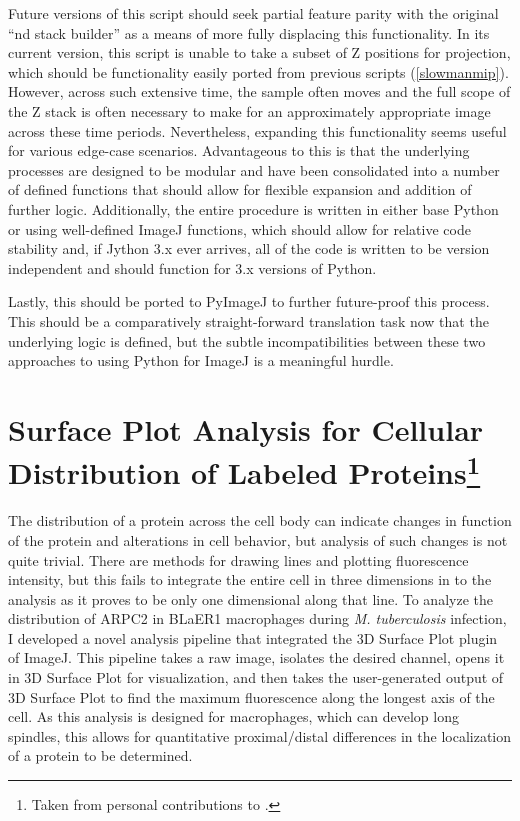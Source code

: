 Future versions of this script should seek partial feature parity with the original ``nd stack builder'' as a means of more fully displacing this functionality. In its current version, this script is unable to take a subset of Z positions for projection, which should be functionality easily ported from previous scripts (\autoref{slowmanmip}). However, across such extensive time, the sample often moves and the full scope of the Z stack is often necessary to make for an approximately appropriate image across these time periods. Nevertheless, expanding this functionality seems useful for various edge-case scenarios. Advantageous to this is that the underlying processes are designed to be modular and have been consolidated into a number of defined functions that should allow for flexible expansion and addition of further logic. Additionally, the entire procedure is written in either base Python or using well-defined ImageJ functions, which should allow for relative code stability and, if Jython 3.x ever arrives, all of the code is written to be version independent and should function for 3.x versions of Python.

Lastly, this should be ported to PyImageJ to further future-proof this process. This should be a comparatively straight-forward translation task now that the underlying logic is defined, but the subtle incompatibilities between these two approaches to using Python for ImageJ is a meaningful hurdle.

\section[Surface Plot Analysis for Cellular Distribution of Labeled Proteins]{Surface Plot Analysis for Cellular Distribution of Labeled Proteins\footnote{Taken from personal contributions to \citet{Saelens2022}.}}

The distribution of a protein across the cell body can indicate changes in function of the protein and alterations in cell behavior, but analysis of such changes is not quite trivial. There are methods for drawing lines and plotting fluorescence intensity, but this fails to integrate the entire cell in three dimensions in to the analysis as it proves to be only one dimensional along that line. To analyze the distribution of ARPC2 in BLaER1 macrophages during \textit{M. tuberculosis} infection, I developed a novel analysis pipeline that integrated the 3D Surface Plot plugin of ImageJ. This pipeline takes a raw image, isolates the desired channel, opens it in 3D Surface Plot for visualization, and then takes the user\hyp{}generated output of 3D Surface Plot to find the maximum fluorescence along the longest axis of the cell. As this analysis is designed for macrophages, which can develop long spindles, this allows for quantitative proximal/distal differences in the localization of a protein to be determined.

